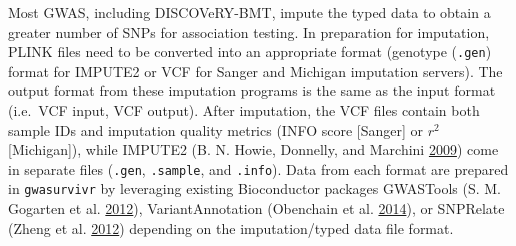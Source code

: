\documentclass[]{DissertateOSU}
\begin{document}
Most GWAS, including DISCOVeRY-BMT, impute the typed data to obtain a
greater number of SNPs for association testing. In preparation for
imputation, PLINK files need to be converted into an appropriate format
(genotype (\texttt{.gen}) format for IMPUTE2 or VCF for Sanger and
Michigan imputation servers). The output format from these imputation
programs is the same as the input format (i.e.~VCF input, VCF output).
After imputation, the VCF files contain both sample IDs and imputation
quality metrics (INFO score {[}Sanger{]} or \(r^2\) {[}Michigan{]}),
while IMPUTE2 (B. N. Howie, Donnelly, and Marchini
\protect\hyperlink{ref-Howie_2009}{2009}) come in separate files
(\texttt{.gen}, \texttt{.sample}, and \texttt{.info}). Data from each
format are prepared in \texttt{gwasurvivr} by leveraging existing
Bioconductor packages GWASTools (S. M. Gogarten et al.
\protect\hyperlink{ref-gwastools}{2012}), VariantAnnotation (Obenchain
et al. \protect\hyperlink{ref-variantannotation}{2014}), or SNPRelate
(Zheng et al. \protect\hyperlink{ref-snprelate}{2012}) depending on the
imputation/typed data file format.
\end{document}

